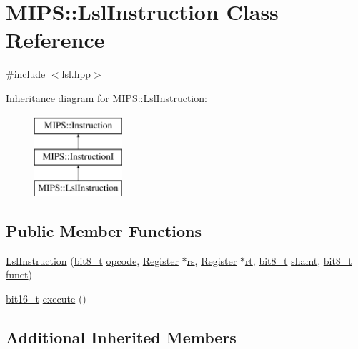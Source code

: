 \hypertarget{classMIPS_1_1LslInstruction}{}\section{M\+I\+PS\+:\+:Lsl\+Instruction Class Reference}
\label{classMIPS_1_1LslInstruction}


{\ttfamily \#include $<$lsl.\+hpp$>$}

Inheritance diagram for M\+I\+PS\+:\+:Lsl\+Instruction\+:\begin{figure}[H]
\begin{center}
\leavevmode
\includegraphics[height=3.000000cm]{classMIPS_1_1LslInstruction}
\end{center}
\end{figure}
\subsection*{Public Member Functions}
\begin{DoxyCompactItemize}
\item 
\hyperlink{classMIPS_1_1LslInstruction_ae6e4596399372f3eb4eb4b9685e107e6}{Lsl\+Instruction} (\hyperlink{core_8hpp_a6074bae122ae7b527864eec42c728c3c}{bit8\+\_\+t} \hyperlink{classMIPS_1_1Instruction_a45cc6808b5dde8a5d41067d148b55476}{opcode}, \hyperlink{classMIPS_1_1Register}{Register} $\ast$\hyperlink{classMIPS_1_1InstructionI_a2be191d5b3dce505e2e626ec02eb4d62}{rs}, \hyperlink{classMIPS_1_1Register}{Register} $\ast$\hyperlink{classMIPS_1_1InstructionI_add1db07a5c954f35271de8c8a5737487}{rt}, \hyperlink{core_8hpp_a6074bae122ae7b527864eec42c728c3c}{bit8\+\_\+t} \hyperlink{classMIPS_1_1InstructionI_aa9b6da37c374c2ec8d96448d341e5e7d}{shamt}, \hyperlink{core_8hpp_a6074bae122ae7b527864eec42c728c3c}{bit8\+\_\+t} \hyperlink{classMIPS_1_1InstructionI_a5c6efcbbd233a7447c1fe24ea0a1e558}{funct})
\item 
\hyperlink{core_8hpp_adc265a970bc35995b5879784bbb3f1b7}{bit16\+\_\+t} \hyperlink{classMIPS_1_1LslInstruction_af6483e18e765310b9900c7fd8322b0c8}{execute} ()
\end{DoxyCompactItemize}
\subsection*{Additional Inherited Members}


